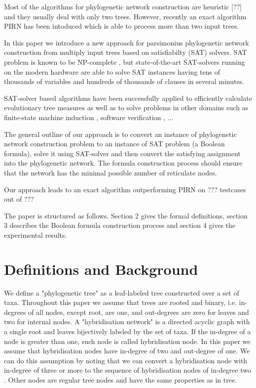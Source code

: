 \documentclass[runningheads, envcountsame, a4paper]{llncs}
\begin{document}
Most of the algorithms for phylogenetic network construction are heuristic [??] and they usually deal with only two trees.
However, recently an exact algorithm PIRN has been intoduced \cite{wu2013algorithm} which is able to process more than two input trees.

In this paper we introduce a new approach for parsimonius
phylogenetic network construction from multiply input trees based on satisfiabilty (SAT) solvers.
SAT problem is known to be NP-complete \cite{bordewich2007computing}, but state-of-the-art SAT-solvers running on the modern hardware 
are able to solve SAT instances having tens of thousands of variables and hundreds of thousands of clauses in several minutes.

SAT-solver based algorithms have been successfully applied to efficiently calculate evolutionary tree measures \cite{bonet2009efficiently}
as well as to solve problems in other domains such as
finite-state machine induction \cite{heule2010exact}, software verification \cite{}, ...

The general outline of our approach is to convert an instance of phylogenetic network construction 
problem to an instance of SAT problem (a Boolean formula), solve it using SAT-solver and then convert 
the satisfying assignment into the phylogenetic network. The formula construction process should ensure that
the network has the minimal possible number of reticulate nodes.

Our approach leads to an exact algorithm outperforming PIRN on ??? testcases out of ???

The paper is structured as follows. Section 2 gives the formal definitions, section 3 describes the Boolean formula
construction process and section 4 gives the experimental results.

\section{Definitions and Background}

We define a "phylogenetic tree" as a leaf-labeled tree constructed over a set of taxa. Throughout this paper we assume that trees are rooted and binary, i.e. in-degrees of all nodes, except root, are one, and out-degrees are zero for leaves and two for internal nodes. A "hybridisation network" is a directed acyclic graph with a single root and leaves bijectively labeled by the set of taxa. If the in-degree of a node is greater than one, such node is called hybridisation node. In this paper we assume that hybridisation nodes have in-degree of two and out-degree of one. We can do this assumption by noting that we can convert a hybridisation node with in-degree of three or more to the sequence of hybridisation nodes of in-degree two \cite{wu2010close}. Other nodes are regular tree nodes and have the same properties as in tree.
\end{document}
